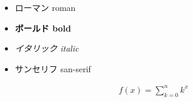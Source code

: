 \documentclass[a4j]{ltjsarticle}
\begin{document}
\begin{itemize}
	\item \textrm{ローマン roman}
	\item \textbf{ボールド bold}
	\item \textit{イタリック italic}
	\item \textsf{サンセリフ san-serif}
\end{itemize}

\begin{align}
	f(x) = \sum_{k=0}^{n} k^{x}
\end{align}
\end{document}

